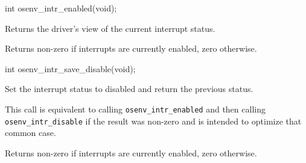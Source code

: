 \begin{apisyn}
	\funcproto int osenv_intr_enabled(void);
\end{apisyn}
\drvtoosn
\begin{apidesc}
	Returns the driver's view of the current interrupt status.
\end{apidesc}
\begin{apiret}
	Returns non-zero if interrupts are currently enabled, zero otherwise.
\end{apiret}

\begin{apisyn}
	\funcproto int osenv_intr_save_disable(void);
\end{apisyn}
\drvtoosn
\begin{apidesc}
	Set the interrupt status to disabled and return the previous status.

	This call is equivalent to calling {\tt osenv_intr_enabled} and then
	calling {\tt osenv_intr_disable} if the result was non-zero and is
	intended to optimize that common case.
\end{apidesc}
\begin{apiret}
	Returns non-zero if interrupts are currently enabled, zero otherwise.
\end{apiret}


